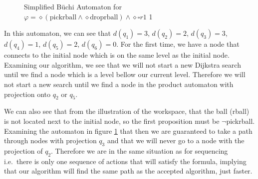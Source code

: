 \begin{figure}
\centering
{}
\caption{Simplified B\"uchi Automaton for $\varphi = \diamond (\text{pickrball} \wedge \diamond \text{droprball}) \wedge \diamond \square r1$ 1}
\label{fig:ex1SimplifiedBuchi}
\end{figure} 

In this automaton, we can see that $d(q_1)=3$, $d(q_2)=2$, $d(q_3)=3$, $d(q_4)=1$, $d(q_5)=2$, $d(q_6)=0$. For the first time, we have a node that connects to the initial node which is on the same level as the initial node. Examining our algorithm, we see that we will not start a new Dijkstra search until we find a node which is a level bellow our current level. Therefore we will not start a new search until we find a node in the product automaton with projection onto $q_2$ or $q_5$.

We can also see that from the illustration of the workspace, that the ball (rball) is not located next to the initial node, so the first proposition must be $\neg$pickrball. Examining the automaton in figure \ref{fig:ex1SimplifiedBuchi} that then we are guaranteed to take a path through nodes with projection $q_3$ and that we will never go to a node with the projection of $q_2$. Therefore we are in the same situation as for sequencing i.e.\ there is only one sequence of actions that will satisfy the formula, implying that our algorithm will find the same path as the accepted algorithm, just faster. 

